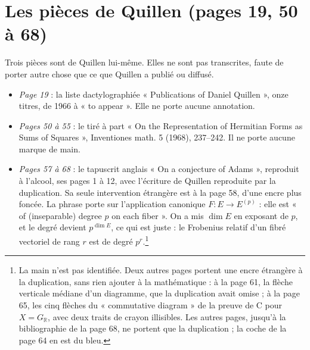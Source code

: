 \documentclass[11pt,a4paper]{article}
\begin{document}
\section*{Les pièces de Quillen (pages 19, 50 à 68)}

Trois pièces sont de Quillen lui-même. Elles ne sont pas transcrites, faute de
porter autre chose que ce que Quillen a publié ou diffusé.
\begin{itemize}
  \item \emph{Page 19} : la liste dactylographiée « Publications of Daniel
  Quillen », onze titres, de 1966 à « to appear ». Elle ne porte aucune
  annotation.
  \item \emph{Pages 50 à 55} : le tiré à part « On the Representation of
  Hermitian Forms as Sums of Squares », Inventiones math. 5 (1968), 237--242.
  Il ne porte aucune marque de main.
  \item \emph{Pages 57 à 68} : le tapuscrit anglais « On a conjecture of
  Adams », reproduit à l'alcool, ses pages 1 à 12, avec l'écriture de Quillen
  reproduite par la duplication. Sa seule intervention étrangère est à la page
  58, d'une encre plus foncée. La phrase porte sur l'application canonique $F :
  E \to E^{(p)}$ : elle est « of (inseparable) degree $p$ on each fiber ». On
  a mis $\dim E$ en exposant de $p$, et le degré devient $p^{\dim E}$, ce qui
  est juste : le Frobenius relatif d'un fibré vectoriel de rang $r$ est de
  degré $p^{r}$.\footnote{La main n'est pas identifiée. Deux autres pages portent
  une encre étrangère à la duplication, sans rien ajouter à la mathématique :
  à la page 61, la flèche verticale médiane d'un diagramme, que la duplication
  avait omise ; à la page 65, les cinq flèches du « commutative diagram » de la
  preuve de C pour $X = G_{\mathbb{R}}$, avec deux traits de crayon illisibles.
  Les autres pages, jusqu'à la bibliographie de la page 68, ne portent que la
  duplication ; la coche de la page 64 en est du bleu.}
\end{itemize}
\end{document}
